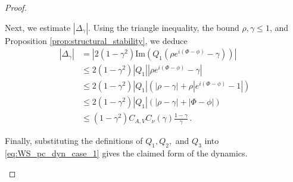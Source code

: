\documentclass[10pt]{article}
\theoremstyle{definition}
\theoremstyle{definition}
\numberwithin{equation}{section}
\newcommand{\im}[1]{\mathrm{Im} \left(#1\right)}
\newcommand{\DeltaGamma}{\Delta_{\gamma}}
\begin{document}
\begin{proof}
\begin{itemize}
    Next, we estimate $|\DeltaGamma|$.
    Using the triangle inequality, the bound $\rho, \gamma \leq 1$, and Proposition \ref{prop:structural_stability}, we deduce
    \begin{equation*}
    \begin{aligned}
    |\DeltaGamma| &= \left|2(1-\gamma^2) \im{Q_1 \left(\rho e^{i(\Phi - \phi)} - \gamma \right)} \right|\\
    &\leq 2(1-\gamma^2) |Q_1| \left|\rho e^{i(\Phi - \phi)} - \gamma \right| \\
    &\leq 2(1-\gamma^2) |Q_1| \left( |\rho - \gamma| + \rho |e^{i(\Phi - \phi)} - 1| \right)\\
    & \leq 2 (1 - \gamma^2) |Q_1| \left( |\rho - \gamma| + |\Phi - \phi| \right)\\
    &\leq (1 - \gamma^2) C_{A,V} C_{\nu}(\gamma) \frac{1 - \gamma}{\gamma} \, .
    \end{aligned}
    \end{equation*}
    
    Finally, substituting the definitions of $Q_1, Q_2,$ and $Q_3$ into \eqref{eq:WS_pc_dyn_case_1} gives the claimed form of the dynamics.


\end{itemize}
\end{proof}
\end{document}
